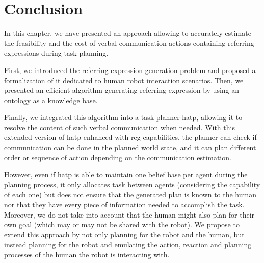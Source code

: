 \documentclass[a4paper,11pt,twoside]{StyleThese}
\begin{document}

\section{Conclusion}
In this chapter, we have presented an approach allowing to accurately estimate the feasibility and the cost of verbal communication actions containing referring expressions during task planning.

First, we introduced the referring expression generation problem and proposed a formalization of it dedicated to human robot interaction scenarios. Then, we presented an efficient algorithm generating referring expression by using an ontology as a knowledge base.

Finally, we integrated this algorithm into a task planner \acrshort{hatp}, allowing it to resolve the content of such verbal communication when needed. With this extended version of \acrshort{hatp} enhanced with \acrshort{reg} capabilities, the planner can check if communication can be done in the planned world state, and it can plan different order or sequence of action depending on the communication estimation.

However, even if \acrshort{hatp} is able to maintain one belief base per agent during the planning process, it only allocates task between agents (considering the capability of each one) but does not ensure that the generated plan is known to the human nor that they have every piece of information needed to accomplish the task. Moreover, we do not take into account that the human might also plan for their own goal (which may or may not be shared with the robot). 
We propose to extend this approach by not only planning for the robot and the human, but instead planning for the robot and emulating the action, reaction and planning processes of the human the robot is interacting with.

\ifdefined{}
\else


\end{document}

